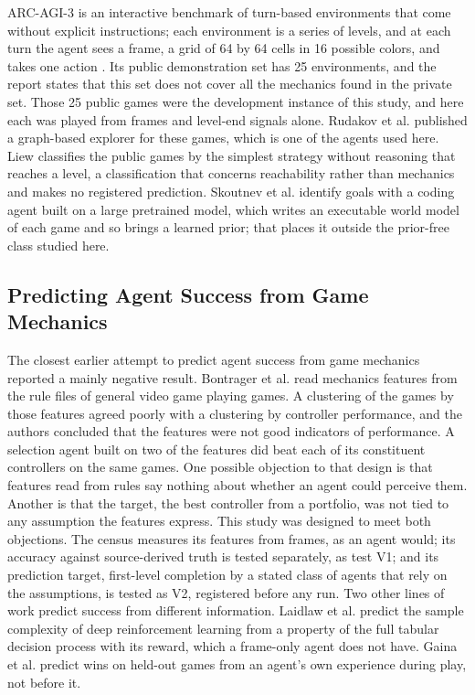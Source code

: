 \documentclass[twocolumn]{svjour3}
\begin{document}
ARC-AGI-3 is an interactive benchmark of turn-based environments that
come without explicit instructions; each environment is a series of
levels, and at each turn the agent sees a frame, a grid of 64 by 64
cells in 16 possible colors, and takes one action
\citep{arcprize2026arcagi3}. Its public demonstration set has 25
environments, and the report states that this set does not cover all the
mechanics found in the private set. Those 25 public games were the
development instance of this study, and here each was played from frames
and level-end signals alone. Rudakov et al. \citep{rudakov2025graph}
published a graph-based explorer for these games, which is one of the
agents used here. Liew \citep{liew2026explore} classifies the public
games by the simplest strategy without reasoning that reaches a level, a
classification that concerns reachability rather than mechanics and
makes no registered prediction. Skoutnev et al. \citep{skoutnev2026twin}
identify goals with a coding agent built on a large pretrained model,
which writes an executable world model of each game and so brings a
learned prior; that places it outside the prior-free class studied here.

\subsection{Predicting Agent Success from Game
Mechanics}\label{sec:bontrager}

The closest earlier attempt to predict agent success from game mechanics
reported a mainly negative result. Bontrager et al.
\citep{bontrager2016matching} read mechanics features from the rule
files of general video game playing games. A clustering of the games by
those features agreed poorly with a clustering by controller
performance, and the authors concluded that the features were not good
indicators of performance. A selection agent built on two of the
features did beat each of its constituent controllers on the same games.
One possible objection to that design is that features read from rules
say nothing about whether an agent could perceive them. Another is that
the target, the best controller from a portfolio, was not tied to any
assumption the features express. This study was designed to meet both
objections. The census measures its features from frames, as an agent
would; its accuracy against source-derived truth is tested separately,
as test V1; and its prediction target, first-level completion by a
stated class of agents that rely on the assumptions, is tested as V2,
registered before any run. Two other lines of work predict success from
different information. Laidlaw et al. \citep{laidlaw2023horizon} predict
the sample complexity of deep reinforcement learning from a property of
the full tabular decision process with its reward, which a frame-only
agent does not have. Gaina et al. \citep{gaina2018winprediction} predict
wins on held-out games from an agent's own experience during play, not
before it.
\end{document}
